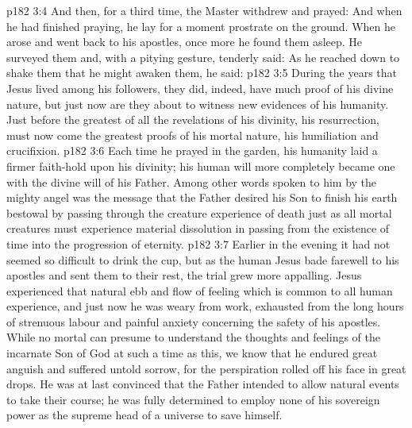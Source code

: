 \vs p182 3:4 And then, for a third time, the Master withdrew and prayed:  And when he had finished praying, he lay for a moment prostrate on the ground. When he arose and went back to his apostles, once more he found them asleep. He surveyed them and, with a pitying gesture, tenderly said:  As he reached down to shake them that he might awaken them, he said: 
\vs p182 3:5 \pc During the years that Jesus lived among his followers, they did, indeed, have much proof of his divine nature, but just now are they about to witness new evidences of his humanity. Just before the greatest of all the revelations of his divinity, his resurrection, must now come the greatest proofs of his mortal nature, his humiliation and crucifixion.
\vs p182 3:6 Each time he prayed in the garden, his humanity laid a firmer faith\hyp{}hold upon his divinity; his human will more completely became one with the divine will of his Father. Among other words spoken to him by the mighty angel was the message that the Father desired his Son to finish his earth bestowal by passing through the creature experience of death just as all mortal creatures must experience material dissolution in passing from the existence of time into the progression of eternity.
\vs p182 3:7 Earlier in the evening it had not seemed so difficult to drink the cup, but as the human Jesus bade farewell to his apostles and sent them to their rest, the trial grew more appalling. Jesus experienced that natural ebb and flow of feeling which is common to all human experience, and just now he was weary from work, exhausted from the long hours of strenuous labour and painful anxiety concerning the safety of his apostles. While no mortal can presume to understand the thoughts and feelings of the incarnate Son of God at such a time as this, we know that he endured great anguish and suffered untold sorrow, for the perspiration rolled off his face in great drops. He was at last convinced that the Father intended to allow natural events to take their course; he was fully determined to employ none of his sovereign power as the supreme head of a universe to save himself.
